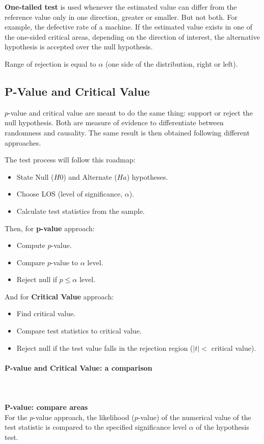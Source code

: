 \documentclass{article}
\begin{document}
\textbf{One-tailed test} is used whenever the estimated value can differ from the reference value only in one direction, greater or smaller. But not both. 
For example, the defective rate of a machine. 
If the estimated value exists in one of the one-sided critical areas, depending on the direction of interest, the alternative hypothesis is accepted over the null hypothesis. 

Range of rejection is equal to $\alpha$ (one side of the distribution, right or left).

\subsection{P-Value and Critical Value}
$p$-value and critical value are meant to do the same thing: support or reject the null hypothesis. Both are measure of evidence to differentiate between randomness and causality. 
The same result is then obtained following different approaches. 

The test process will follow this roadmap:
\begin{itemize}
    \item State Null ($H0$) and Alternate ($Ha$) hypotheses.
    \item Choose LOS (level of significance, $\alpha$).
    \item Calculate test statistics from the sample.
\end{itemize}

Then, for \textbf{p-value} approach:
\begin{itemize}
    \item Compute $p$-value.
    \item Compare $p$-value to $\alpha$ level.
    \item Reject null if $p \leq \alpha$ level.
\end{itemize}

And for \textbf{Critical Value} approach:
\begin{itemize}
    \item Find critical value.
    \item Compare test statistics to critical value.
    \item Reject null if the test value falls in the rejection region ($|t| <$ critical value).
\end{itemize}

\paragraph{P-value and Critical Value: a comparison}\mbox{} \\
\mbox{} \\
\textbf{P-value: compare areas}\\
For the $p$-value approach, the likelihood ($p$-value) of the numerical value of the test statistic is compared to the specified significance level $\alpha$ of the hypothesis test.
\end{document}
